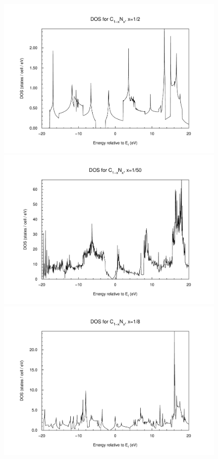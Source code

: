 				\begin{figure}
					\begin{minipage}[t]{0.9\textwidth}
						\includegraphics[width=\textwidth]{Results/Nitrogen/Nitrogen1/nitrogen1dos.pdf}
					\end{minipage}
					\begin{minipage}[t]{0.9\textwidth}
						\includegraphics[width=\textwidth]{Results/Nitrogen/Nitrogen5/nitrogen5dos.pdf}
					\end{minipage}
					\begin{minipage}[t]{0.3\textwidth}
						\includegraphics[width=\textwidth]{Results/Nitrogen/Nitrogen2/nitrogen2dos.pdf}

\end{minipage}
\end{figure}
